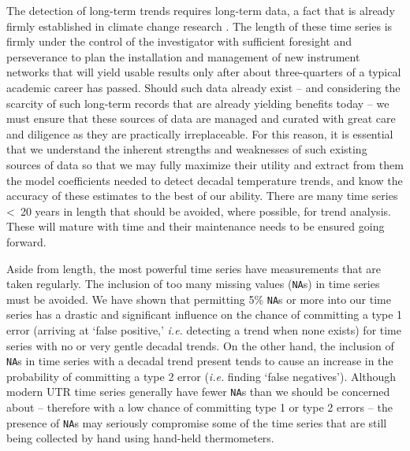 \documentclass[twocol]{ametsoc}
\begin{document}
The detection of long-term trends requires long-term data, a fact that is already firmly established in climate change research \citep{Ohring2005, IPCC2013}. The length of these time series is firmly under the control of the investigator with sufficient foresight and perseverance to plan the installation and management of new instrument networks that will yield usable results only after about three-quarters of a typical academic career has passed. Should such data already exist -- and considering the scarcity of such long-term records that are already yielding benefits today -- we must ensure that these sources of data are managed and curated with great care and diligence as they are practically irreplaceable. For this reason, it is essential that we understand the inherent strengths and weaknesses of such existing sources of data so that we may fully maximize their utility and extract from them the model coefficients needed to detect decadal temperature trends, and know the accuracy of these estimates to the best of our ability. There are many time series \textless~20 years in length that should be avoided, where possible, for trend analysis. These will mature with time and their maintenance needs to be ensured going forward.

Aside from length, the most powerful time series have measurements that are taken regularly. The inclusion of too many missing values (\texttt{NA}s) in time series must be avoided. We have shown that permitting 5\% \texttt{NA}s or more into our time series has a drastic and significant influence on the chance of committing a type 1 error (arriving at `false positive,' \emph{i.e.} detecting a trend when none exists) for time series with no or very gentle decadal trends. On the other hand, the inclusion of \texttt{NA}s in time series with a decadal trend present tends to cause an increase in the probability of committing a type 2 error (\emph{i.e.} finding `false negatives'). Although modern UTR time series generally have fewer \texttt{NA}s than we should be concerned about -- therefore with a low chance of committing type 1 or type 2 errors -- the presence of \texttt{NA}s may seriously compromise some of the time series that are still being collected by hand using hand-held thermometers.
\end{document}
